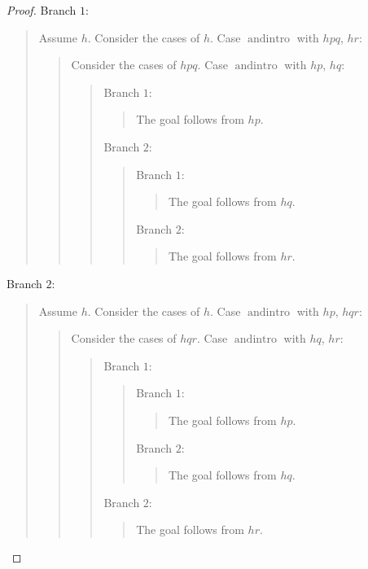\documentclass[11pt]{article}
\theoremstyle{definition}
\begin{document}
\begin{proof}
Branch \(1\):
\begin{quote}
Assume \(h\).
Consider the cases of \(h\).
Case \(\operatorname{andintro}\) with \(hpq\), \(hr\):
\begin{quote}
Consider the cases of \(hpq\).
Case \(\operatorname{andintro}\) with \(hp\), \(hq\):
\begin{quote}
Branch \(1\):
\begin{quote}
The goal follows from \(hp\).
\end{quote}
Branch \(2\):
\begin{quote}
Branch \(1\):
\begin{quote}
The goal follows from \(hq\).
\end{quote}
Branch \(2\):
\begin{quote}
The goal follows from \(hr\).
\end{quote}
\end{quote}
\end{quote}
\end{quote}
\end{quote}
Branch \(2\):
\begin{quote}
Assume \(h\).
Consider the cases of \(h\).
Case \(\operatorname{andintro}\) with \(hp\), \(hqr\):
\begin{quote}
Consider the cases of \(hqr\).
Case \(\operatorname{andintro}\) with \(hq\), \(hr\):
\begin{quote}
Branch \(1\):
\begin{quote}
Branch \(1\):
\begin{quote}
The goal follows from \(hp\).
\end{quote}
Branch \(2\):
\begin{quote}
The goal follows from \(hq\).
\end{quote}
\end{quote}
Branch \(2\):
\begin{quote}
The goal follows from \(hr\).
\end{quote}
\end{quote}
\end{quote}
\end{quote}
\end{proof}
\end{document}
